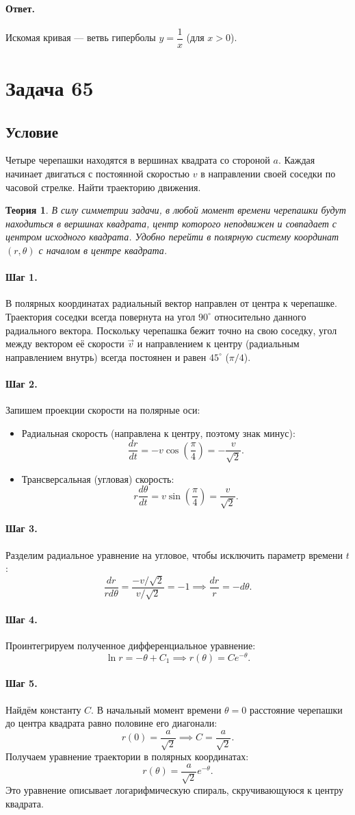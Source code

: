 \documentclass[12pt,a4paper]{article}
\theoremstyle{solution}
\newtheorem*{theory}{Теория}
\newcommand{\task}[1]{\newpage\section*{Задача #1}}
\newcommand{\answer}{\paragraph{Ответ.}}
\newcommand{\step}[1]{\paragraph{Шаг #1.}}
\begin{document}
\answer
Искомая кривая — ветвь гиперболы $y = \dfrac{1}{x}$ (для $x > 0$).

\task{65}
\subsection*{Условие}
Четыре черепашки находятся в вершинах квадрата со стороной $a$. Каждая начинает двигаться с постоянной скоростью $v$ в направлении своей соседки по часовой стрелке. Найти траекторию движения.

\begin{theory}
В силу симметрии задачи, в любой момент времени черепашки будут находиться в вершинах квадрата, центр которого неподвижен и совпадает с центром исходного квадрата. Удобно перейти в полярную систему координат $(r, \theta)$ с началом в центре квадрата.
\end{theory}

\step{1} В полярных координатах радиальный вектор направлен от центра к черепашке. Траектория соседки всегда повернута на угол $90^\circ$ относительно данного радиального вектора. 
Поскольку черепашка бежит точно на свою соседку, угол между вектором её скорости $\vec{v}$ и направлением к центру (радиальным направлением внутрь) всегда постоянен и равен $45^\circ$ ($\pi/4$).

\step{2} Запишем проекции скорости на полярные оси:
\begin{itemize}
    \item Радиальная скорость (направлена к центру, поэтому знак минус):
    \[
    \frac{dr}{dt} = -v \cos\left(\frac{\pi}{4}\right) = -\frac{v}{\sqrt{2}}.
    \]
    \item Трансверсальная (угловая) скорость:
    \[
    r \frac{d\theta}{dt} = v \sin\left(\frac{\pi}{4}\right) = \frac{v}{\sqrt{2}}.
    \]
\end{itemize}

\step{3} Разделим радиальное уравнение на угловое, чтобы исключить параметр времени $t$:
\[
\frac{dr}{r d\theta} = \frac{-v/\sqrt{2}}{v/\sqrt{2}} = -1 \implies \frac{dr}{r} = -d\theta.
\]

\step{4} Проинтегрируем полученное дифференциальное уравнение:
\[
\ln r = -\theta + C_1 \implies r(\theta) = C e^{-\theta}.
\]

\step{5} Найдём константу $C$. В начальный момент времени $\theta = 0$ расстояние черепашки до центра квадрата равно половине его диагонали:
\[
r(0) = \frac{a}{\sqrt{2}} \implies C = \frac{a}{\sqrt{2}}.
\]
Получаем уравнение траектории в полярных координатах:
\[
r(\theta) = \frac{a}{\sqrt{2}} e^{-\theta}.
\]
Это уравнение описывает логарифмическую спираль, скручивающуюся к центру квадрата.
\end{document}
